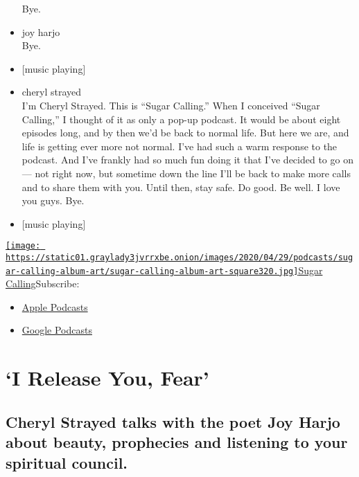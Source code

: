 \begin{itemize}
  Bye.
\item
  joy harjo\\
  Bye.
\item
  {[}music playing{]}
\item
  cheryl strayed\\
  I'm Cheryl Strayed. This is ``Sugar Calling.'' When I conceived
  ``Sugar Calling,'' I thought of it as only a pop-up podcast. It would
  be about eight episodes long, and by then we'd be back to normal life.
  But here we are, and life is getting ever more not normal. I've had
  such a warm response to the podcast. And I've frankly had so much fun
  doing it that I've decided to go on --- not right now, but sometime
  down the line I'll be back to make more calls and to share them with
  you. Until then, stay safe. Do good. Be well. I love you guys. Bye.
\item
  {[}music playing{]}
\end{itemize}

\href{https://www.nytimes3xbfgragh.onion/column/sugar-calling}{\texttt{[image: https://static01.graylady3jvrrxbe.onion/images/2020/04/29/podcasts/sugar-calling-album-art/sugar-calling-album-art-square320.jpg]}Sugar
Calling}Subscribe:

\begin{itemize}
\tightlist
\item
  \href{https://itunes.apple.com/us/podcast/id1505881384}{Apple
  Podcasts}
\item
  \href{https://podcasts.google.com/?feed=aHR0cHM6Ly9yc3MuYXJ0MTkuY29tL3N1Z2FyLWNhbGxpbmc\&ved=0CAUQrrcFahcKEwjA8Kyn09voAhUAAAAAHQAAAAAQBQ}{Google
  Podcasts}
\end{itemize}

\hypertarget{i-release-you-fear-1}{%
\section{`I Release You, Fear'}\label{i-release-you-fear-1}}

\hypertarget{cheryl-strayed-talks-with-the-poet-joy-harjo-about-beauty-prophecies-and-listening-to-your-spiritual-council-1}{%
\subsection{Cheryl Strayed talks with the poet Joy Harjo about beauty,
prophecies and listening to your spiritual
council.}\label{cheryl-strayed-talks-with-the-poet-joy-harjo-about-beauty-prophecies-and-listening-to-your-spiritual-council-1}}

